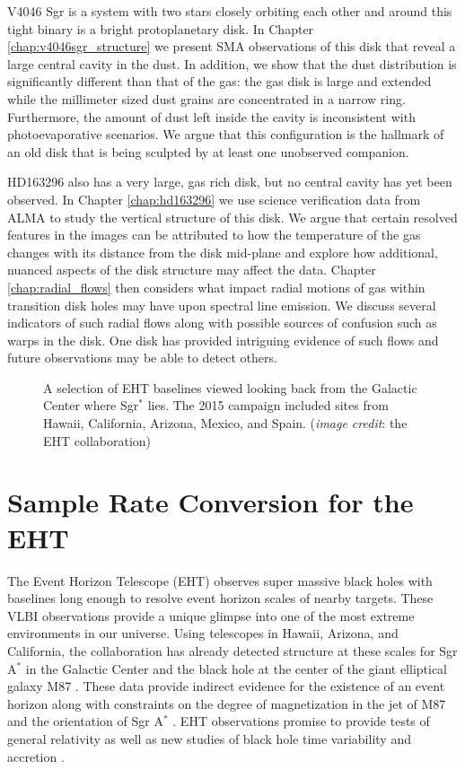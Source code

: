 V4046 Sgr is a system with two stars closely orbiting each other and around this tight binary is a bright
protoplanetary disk.  In Chapter \ref{chap:v4046sgr_structure} we present SMA observations 
of this disk that reveal a large central cavity in the dust.  In addition, we show that the dust 
distribution is significantly different than that of the gas: the gas disk is large and extended while the 
millimeter sized dust grains are concentrated in a narrow ring.  Furthermore, the amount of dust left inside
the cavity is inconsistent with photoevaporative scenarios.  We argue 
that this configuration is the hallmark of an old disk that is being sculpted by at least one unobserved 
companion. 

HD163296 also has a very large, gas rich disk, but no central cavity has yet been observed.  In Chapter 
\ref{chap:hd163296} 
we use science verification data from ALMA to study the vertical structure of 
this disk.  We argue that certain resolved features in the images can be attributed to how the temperature of 
the gas changes with
its distance from the disk mid-plane and explore how additional, nuanced aspects of the disk structure may affect
the data.  Chapter \ref{chap:radial_flows} then considers what impact radial motions of gas within transition 
disk holes may have upon spectral line emission.  We discuss several indicators of such radial flows along 
with possible sources of confusion such as warps in the disk.  One disk has provided intriguing
evidence of such flows \citep{casassus13,casassus15} and future observations may be able to detect others.

\begin{figure}[t]
\caption{A selection of EHT baselines viewed looking back from the Galactic Center where Sgr$^\ast$ lies.  The 
2015 campaign included sites 
from Hawaii, California, Arizona, Mexico, and Spain. ({\it image credit}: the EHT collaboration)}
\label{fig:eht_baselines}
\end{figure}

\section{Sample Rate Conversion for the EHT}

The Event Horizon Telescope (EHT) observes super massive black holes with baselines long enough
to resolve event horizon scales of nearby targets.  These VLBI observations provide a 
unique glimpse into one of the most extreme environments in our universe.  Using telescopes in Hawaii, Arizona, 
and California, the collaboration has already detected structure at these scales for Sgr A$^\ast$ in the Galactic 
Center and the black hole at the center of the giant elliptical galaxy M87 
\citep{doeleman08,doeleman12}.  These data provide indirect 
evidence for the existence of an event horizon \citep{broderick15} along with constraints on the degree of 
magnetization in the jet of M87 \citep{kino15} and the orientation of Sgr A$^\ast$ \citep{broderick11}.  EHT 
observations promise to provide tests of general relativity \citep{luminet79,johannsen10,bambi13,broderick14} as 
well as new studies of black hole time variability \citep{doeleman09} and accretion \citep{chan15}.

